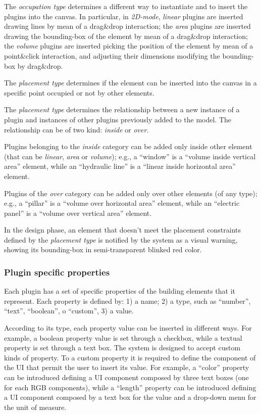 \noindent The \emph{occupation type} determines a different way to instantiate and to insert the plugins into the canvas.
In particular, in \emph{2D-mode}, \emph{linear} plugins are inserted drawing lines by mean of a drag\&drop interaction;
the \emph{area} plugins are inserted drawing the bounding-box of the element by mean of a drag\&drop interaction;
the \emph{volume} plugins are inserted picking the position of the element by mean of a point\&click interaction,
and adjusting their dimensions modifying the bounding-box by drag\&drop.

\noindent The \emph{placement type} determines if the element can be inserted into the canvas in a specific point occupied or not by other elements.

\noindent The \emph{placement type} determines the relationship between a new instance of a plugin and instances of other plugins previously added to the model. The relationship can be of two kind: \emph{inside} or \emph{over}.

\noindent Plugins belonging to the \emph{inside} category can be added only inside other element (that can be \emph{linear}, \emph{area} or \emph{volume}); e.g., a ``window'' is a ``volume inside vertical area'' element,
while an ``hydraulic line'' is a ``linear inside horizontal area'' element.

\noindent Plugins of the \emph{over} category can be added only over other elements (of any type);
e.g., a ``pillar'' is a ``volume over horizontal area'' element,
while an ``electric panel'' is a ``volume over vertical area'' element.

In the design phase, an element that doesn't meet the placement constraints defined by the \emph{placement type} is notified by the system as a visual warning, showing its bounding-box in semi-transparent blinked red color.

\subsubsection{Plugin specific properties}

\noindent Each plugin has a set of specific properties of the building elements that it represent.
Each property is defined by: 1) a name; 2) a type, such as ``number'', ``text'', ``boolean'', o ``custom'', 3) a value.

\noindent According to its type, each property value can be inserted in different ways.
For example, a boolean property value is set through a checkbox, while a textual property is set through a text box.
The system is designed to accept custom kinds of property. To a custom property it is required to define the component of the UI that permit the user to insert its value.
For example, a ``color'' property can be introduced defining a UI component composed by three text boxes (one for each RGB components), while a ``length'' property can be introduced defining a UI component composed by a text box for the value and a drop-down menu for the unit of measure.

